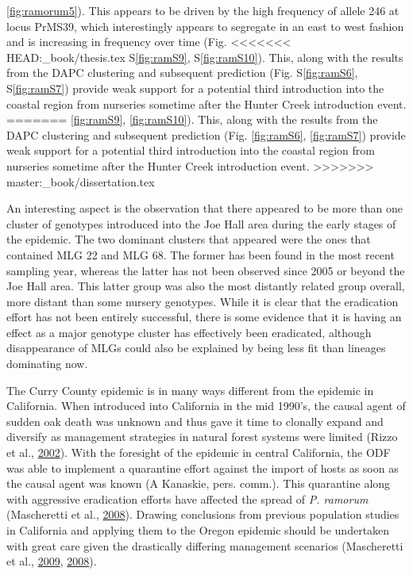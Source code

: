 \documentclass[double,12pt]{beavtex}
\begin{document}
  \ref{fig:ramorum5}). This appears to be driven by the high frequency of
  allele 246 at locus PrMS39, which interestingly appears to segregate in
  an east to west fashion and is increasing in frequency over time (Fig.
<<<<<<< HEAD:_book/thesis.tex
  S\ref{fig:ramS9}, S\ref{fig:ramS10}). This, along with the results from
  the DAPC clustering and subsequent prediction (Fig. S\ref{fig:ramS6},
  S\ref{fig:ramS7}) provide weak support for a potential third
  introduction into the coastal region from nurseries sometime after the
  Hunter Creek introduction event.
=======
  \ref{fig:ramS9}, \ref{fig:ramS10}). This, along with the results from
  the DAPC clustering and subsequent prediction (Fig. \ref{fig:ramS6},
  \ref{fig:ramS7}) provide weak support for a potential third introduction
  into the coastal region from nurseries sometime after the Hunter Creek
  introduction event.
>>>>>>> master:_book/dissertation.tex
  
  An interesting aspect is the observation that there appeared to be more
  than one cluster of genotypes introduced into the Joe Hall area during
  the early stages of the epidemic. The two dominant clusters that
  appeared were the ones that contained MLG 22 and MLG 68. The former has
  been found in the most recent sampling year, whereas the latter has not
  been observed since 2005 or beyond the Joe Hall area. This latter group
  was also the most distantly related group overall, more distant than
  some nursery genotypes. While it is clear that the eradication effort
  has not been entirely successful, there is some evidence that it is
  having an effect as a major genotype cluster has effectively been
  eradicated, although disappearance of MLGs could also be explained by
  being less fit than lineages dominating now.
  
  The Curry County epidemic is in many ways different from the epidemic in
  California. When introduced into California in the mid 1990's, the
  causal agent of sudden oak death was unknown and thus gave it time to
  clonally expand and diversify as management strategies in natural forest
  systems were limited (Rizzo et al.,
  \protect\hyperlink{ref-rizzo2002phytophthora}{2002}). With the foresight
  of the epidemic in central California, the ODF was able to implement a
  quarantine effort against the import of hosts as soon as the causal
  agent was known (A Kanaskie, pers. comm.). This quarantine along with
  aggressive eradication efforts have affected the spread of \emph{P.
  ramorum} (Mascheretti et al.,
  \protect\hyperlink{ref-mascheretti2008reconstruction}{2008}). Drawing
  conclusions from previous population studies in California and applying
  them to the Oregon epidemic should be undertaken with great care given
  the drastically differing management scenarios (Mascheretti et al.,
  \protect\hyperlink{ref-mascheretti2009genetic}{2009},
  \protect\hyperlink{ref-mascheretti2008reconstruction}{2008}).
  
\end{document}
